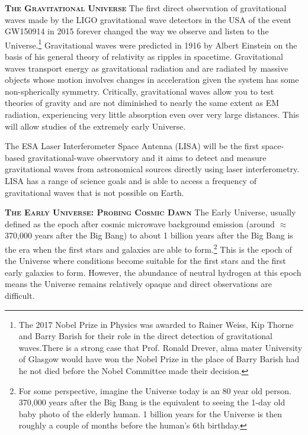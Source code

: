 \documentclass[a4paper,12pt]{texMemo}
\begin{document}
\smallskip
\smallskip
\noindent
{\bfseries \textsc{\textcolor{Cerulean}{The Gravitational Universe}}}
The first direct observation of gravitational waves made by the LIGO
gravitational wave detectors in the USA of the event GW150914 in 2015
forever changed the way we observe and listen to the
Universe.\footnote{The 2017 Nobel Prize in Physics was awarded to
Rainer Weiss, Kip Thorne and Barry Barish for their role in the direct
detection of gravitational waves.There is a strong case that
Prof. Ronald Drever, alma mater University of Glasgow would have won
the Nobel Prize in the place of Barry Barish had he not died before
the Nobel Committee made their decision.}  Gravitational waves were
predicted in 1916 by Albert Einstein on the basis of his general
theory of relativity as ripples in spacetime.  Gravitational waves
transport energy as gravitational radiation and are radiated by
massive objects whose motion involves changes in acceleration given
the system has some non-spherically symmetry.  Critically,
gravitational waves allow you to test theories of gravity and are not
diminished to nearly the same extent as EM radiation, experiencing
very little absorption even over very large distances. This will allow
studies of the extremely early Universe.

\smallskip 
The ESA Laser Interferometer Space Antenna (LISA) will be the first
space-based gravitational-wave observatory and it aims to detect and
measure gravitational waves from astronomical sources directly using
laser interferometry. LISA has a range of science goals and is able to
access a frequency of gravitational waves that is not possible on
Earth.


\smallskip
\smallskip
\noindent
{\bfseries \textsc{\textcolor{Cerulean}{The Early Universe: Probing Cosmic Dawn}}}
The Early Universe, usually defined as the epoch after cosmic
microwave background emission (around $\approx$370,000 years after the
Big Bang) to about 1 billion years after the Big Bang is the era when
the first stars and galaxies are able to form.\footnote{For some
perspective, imagine the Universe today is an 80 year old
person. 370,000 years after the Big Bang is the equivalent to seeing
the 1-day old baby photo of the elderly human. 1 billion years for the
Universe is then roughly a couple of months before the human's 6th
birthday.}  This is the epoch of the Universe where conditions become
suitable for the first stars and the first early galaxies to form.
However, the abundance of neutral hydrogen at this epoch means the
Universe remains relatively opaque and direct observations are
difficult.
\end{document}
